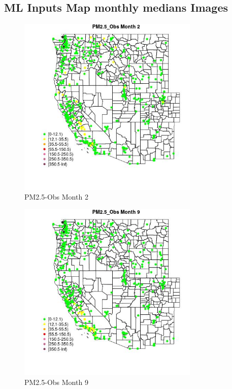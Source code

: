 
\subsection{ML Inputs Map monthly medians Images} 
 

\begin{figure} 
\centering  
\includegraphics[width=0.77\textwidth]{Code_Outputs/ML_input_report_ML_input_PM25_Step5_part_d_de_duplicated_aves_ML_input_MapObsMo2PM25_Obs.jpg} 
\caption{\label{fig:ML_input_report_ML_input_PM25_Step5_part_d_de_duplicated_aves_ML_inputMapObsMo2PM25_Obs}PM2.5-Obs Month 2} 
\end{figure} 
 

\begin{figure} 
\centering  
\includegraphics[width=0.77\textwidth]{Code_Outputs/ML_input_report_ML_input_PM25_Step5_part_d_de_duplicated_aves_ML_input_MapObsMo9PM25_Obs.jpg} 
\caption{\label{fig:ML_input_report_ML_input_PM25_Step5_part_d_de_duplicated_aves_ML_inputMapObsMo9PM25_Obs}PM2.5-Obs Month 9} 
\end{figure} 
 

